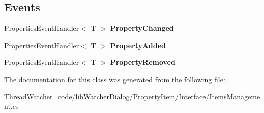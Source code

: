 \subsection*{Events}
\begin{DoxyCompactItemize}
\item 
\hypertarget{classlib_watcher_dialog_1_1_property_item_1_1_items_management_3_01_t_01_4_acef56835ac3f774455a4db52a45ebd2a}{Properties\+Event\+Handler$<$ T $>$ {\bfseries Property\+Changed}}\label{classlib_watcher_dialog_1_1_property_item_1_1_items_management_3_01_t_01_4_acef56835ac3f774455a4db52a45ebd2a}

\item 
\hypertarget{classlib_watcher_dialog_1_1_property_item_1_1_items_management_3_01_t_01_4_a6113cedf31f039b40b1fb8362ed01f89}{Properties\+Event\+Handler$<$ T $>$ {\bfseries Property\+Added}}\label{classlib_watcher_dialog_1_1_property_item_1_1_items_management_3_01_t_01_4_a6113cedf31f039b40b1fb8362ed01f89}

\item 
\hypertarget{classlib_watcher_dialog_1_1_property_item_1_1_items_management_3_01_t_01_4_a2768bd5cf515da9ece8c0139cd35f18d}{Properties\+Event\+Handler$<$ T $>$ {\bfseries Property\+Removed}}\label{classlib_watcher_dialog_1_1_property_item_1_1_items_management_3_01_t_01_4_a2768bd5cf515da9ece8c0139cd35f18d}

\end{DoxyCompactItemize}


The documentation for this class was generated from the following file\+:\begin{DoxyCompactItemize}
\item 
Thread\+Watcher\+\_\+code/lib\+Watcher\+Dialog/\+Property\+Item/\+Interface/Items\+Management.\+cs\end{DoxyCompactItemize}
